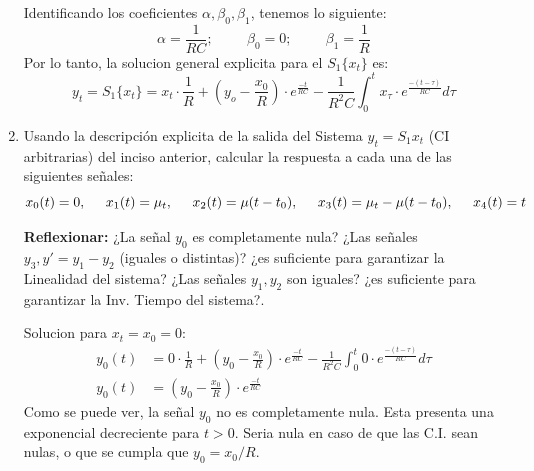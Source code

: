 \documentclass[12pt,a4paper]{report}
\begin{document}
\begin{enumerate}[label=\alph*)]
        Identificando los coeficientes $\alpha, \beta_0, \beta_1$, tenemos lo siguiente:
        $$\alpha = \frac{1}{RC}; \hspace{1cm}\beta_0 = 0; \hspace{1cm}\beta_1 = \frac{1}{R}$$
        Por lo tanto, la solucion general explicita para el $S_1\{x_t\}$ es:
        $$y_t = S_1\{x_t\} = x_t \cdot \frac{1}{R} + \left(y_o - \frac{x_0}{R}\right) \cdot e^{\frac{-t}{RC}} -
        \frac{1}{R^2C} \int_{0}^{t} x_\tau \cdot e^{\frac{-(t-\tau)}{RC}} d\tau$$


    \item Usando la descripción explicita de la salida del Sistema $y_t = S_1{x_t}$ (CI arbitrarias) del inciso
      anterior, calcular la respuesta a cada una de las siguientes señales:
      $$x_0(t) = 0, \hspace{0.5cm}x_1(t) = \mu_t, \hspace{0.5cm}x_2(t) = \mu(t - t_0), \hspace{0.5cm}x_3(t) =
      \mu_t - \mu(t - t_0), \hspace{0.5cm}x_4(t) = t$$

      \textbf{Reflexionar:} ¿La señal $y_0$ es completamente nula? ¿Las señales $y_3, y' = y_1 - y_2$ (iguales o
      distintas)? ¿es suficiente para garantizar la Linealidad del sistema? ¿Las señales $y_1, y_2$ son iguales? ¿es
      suficiente para garantizar la Inv. Tiempo del sistema?.

      Solucion para $x_t = x_0 = 0$:
      \begin{align*}
        y_0(t) &= 0 \cdot \frac{1}{R} + \left(y_0 - \frac{x_0}{R}\right) \cdot
          e^{\frac{-t}{RC}} - \frac{1}{R^2C} \int_{0}^{t} 0 \cdot e^{\frac{-(t-\tau)}{RC}} d\tau\\[6pt]
        y_0(t) &= \left(y_0 - \frac{x_0}{R}\right) \cdot e^{\frac{-t}{RC}}
      \end{align*}
      Como se puede ver, la señal $y_0$ no es completamente nula. Esta presenta una exponencial decreciente para
      $t > 0$. Seria nula en caso de que las C.I. sean nulas, o que se cumpla que $y_0 = x_0/R$.\\


\end{enumerate}
\end{document}
